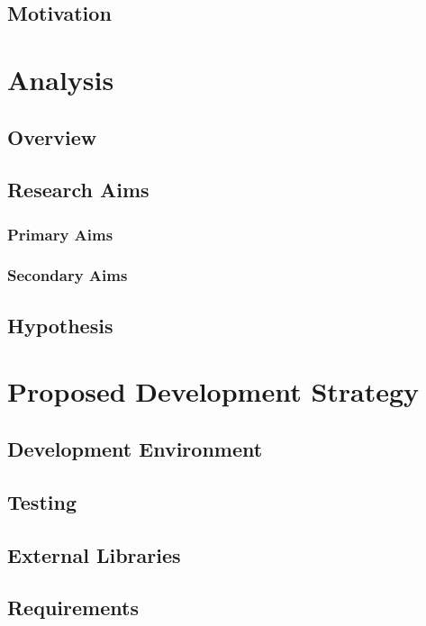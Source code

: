 \subsection{Motivation}

\section{Analysis}

\subsection{Overview}

\subsection{Research Aims}

\subsubsection{Primary Aims}

\subsubsection{Secondary Aims}

\subsection{Hypothesis}

\section{Proposed Development Strategy}

\subsection{Development Environment}

\subsection{Testing}

\subsection{External Libraries}

\subsection{Requirements}

